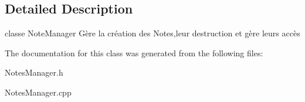 \subsection{\-Detailed \-Description}
classe \-Note\-Manager \-Gère la création des \-Notes,leur destruction et gère leurs accès 

\-The documentation for this class was generated from the following files\-:\begin{DoxyCompactItemize}
\item 
\-Notes\-Manager.\-h\item 
\-Notes\-Manager.\-cpp\end{DoxyCompactItemize}
